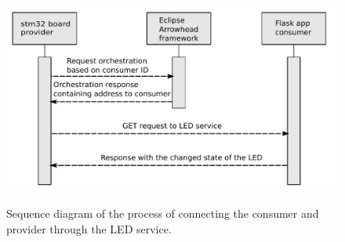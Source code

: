 \begin{figure}[h!]
    \centering
    \includegraphics[width=\textwidth, height=7cm]{Pictures/sequence_diagram_consumer2.pdf} 
    \caption{Sequence diagram of the process of connecting the consumer and provider through the LED service.}
    \label{sequence diagram consumer2}
\end{figure}

